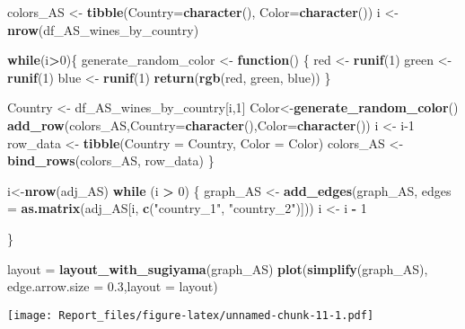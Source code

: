 \documentclass[
]{article}
\newenvironment{Shaded}{\begin{snugshade}}{\end{snugshade}}
\newcommand{\AttributeTok}[1]{\textcolor[rgb]{0.13,0.29,0.53}{#1}}
\newcommand{\ControlFlowTok}[1]{\textcolor[rgb]{0.13,0.29,0.53}{\textbf{#1}}}
\newcommand{\DecValTok}[1]{\textcolor[rgb]{0.00,0.00,0.81}{#1}}
\newcommand{\FloatTok}[1]{\textcolor[rgb]{0.00,0.00,0.81}{#1}}
\newcommand{\FunctionTok}[1]{\textcolor[rgb]{0.13,0.29,0.53}{\textbf{#1}}}
\newcommand{\NormalTok}[1]{#1}
\newcommand{\OtherTok}[1]{\textcolor[rgb]{0.56,0.35,0.01}{#1}}
\newcommand{\SpecialCharTok}[1]{\textcolor[rgb]{0.81,0.36,0.00}{\textbf{#1}}}
\newcommand{\StringTok}[1]{\textcolor[rgb]{0.31,0.60,0.02}{#1}}
\begin{document}
\begin{Shaded}
\begin{Highlighting}[]
\NormalTok{colors\_AS }\OtherTok{\textless{}{-}} \FunctionTok{tibble}\NormalTok{(}\AttributeTok{Country=}\FunctionTok{character}\NormalTok{(), }\AttributeTok{Color=}\FunctionTok{character}\NormalTok{())}
\NormalTok{i }\OtherTok{\textless{}{-}} \FunctionTok{nrow}\NormalTok{(df\_AS\_wines\_by\_country)}

\ControlFlowTok{while}\NormalTok{(i}\SpecialCharTok{\textgreater{}}\DecValTok{0}\NormalTok{)\{}
\NormalTok{  generate\_random\_color }\OtherTok{\textless{}{-}} \ControlFlowTok{function}\NormalTok{() \{}
\NormalTok{  red }\OtherTok{\textless{}{-}} \FunctionTok{runif}\NormalTok{(}\DecValTok{1}\NormalTok{)}
\NormalTok{  green }\OtherTok{\textless{}{-}} \FunctionTok{runif}\NormalTok{(}\DecValTok{1}\NormalTok{)}
\NormalTok{  blue }\OtherTok{\textless{}{-}} \FunctionTok{runif}\NormalTok{(}\DecValTok{1}\NormalTok{)}
  \FunctionTok{return}\NormalTok{(}\FunctionTok{rgb}\NormalTok{(red, green, blue))}
\NormalTok{  \}}
  
\NormalTok{  Country }\OtherTok{\textless{}{-}}\NormalTok{ df\_AS\_wines\_by\_country[i,}\DecValTok{1}\NormalTok{]}
\NormalTok{  Color}\OtherTok{\textless{}{-}}\FunctionTok{generate\_random\_color}\NormalTok{()}
  \FunctionTok{add\_row}\NormalTok{(colors\_AS,}\AttributeTok{Country=}\FunctionTok{character}\NormalTok{(),}\AttributeTok{Color=}\FunctionTok{character}\NormalTok{())}
\NormalTok{  i }\OtherTok{\textless{}{-}}\NormalTok{ i}\DecValTok{{-}1}
\NormalTok{  row\_data }\OtherTok{\textless{}{-}} \FunctionTok{tibble}\NormalTok{(}\AttributeTok{Country =}\NormalTok{ Country, }\AttributeTok{Color =}\NormalTok{ Color)}
\NormalTok{  colors\_AS }\OtherTok{\textless{}{-}} \FunctionTok{bind\_rows}\NormalTok{(colors\_AS, row\_data)}
\NormalTok{\}}

\NormalTok{i}\OtherTok{\textless{}{-}}\FunctionTok{nrow}\NormalTok{(adj\_AS)}
\ControlFlowTok{while}\NormalTok{ (i }\SpecialCharTok{\textgreater{}} \DecValTok{0}\NormalTok{) \{}
\NormalTok{  graph\_AS }\OtherTok{\textless{}{-}} \FunctionTok{add\_edges}\NormalTok{(graph\_AS, }\AttributeTok{edges =} \FunctionTok{as.matrix}\NormalTok{(adj\_AS[i, }\FunctionTok{c}\NormalTok{(}\StringTok{"country\_1"}\NormalTok{, }\StringTok{"country\_2"}\NormalTok{)]))}
\NormalTok{  i }\OtherTok{\textless{}{-}}\NormalTok{ i }\SpecialCharTok{{-}} \DecValTok{1}
  
\NormalTok{\}}

\NormalTok{layout }\OtherTok{=} \FunctionTok{layout\_with\_sugiyama}\NormalTok{(graph\_AS)}
\FunctionTok{plot}\NormalTok{(}\FunctionTok{simplify}\NormalTok{(graph\_AS), }\AttributeTok{edge.arrow.size =} \FloatTok{0.3}\NormalTok{,}\AttributeTok{layout =}\NormalTok{ layout)}
\end{Highlighting}
\end{Shaded}

\texttt{[image: Report\_files/figure-latex/unnamed-chunk-11-1.pdf]}
\end{document}
